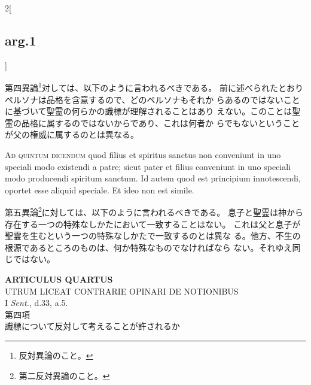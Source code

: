 \documentclass[paper=a4paper,fontsize=10pt,jafontsize=9pt,titlepage]{jlreq}
\begin{document}
\begin{paracol}{2}[\subsection{arg.1}]
\switchcolumn

第四異論\footnote{反対異論のこと。}対しては、以下のように言われるべきである。
前に述べられたとおりペルソナは品格を含意するので、どのペルソナもそれか
らあるのではないことに基づいて聖霊の何らかの識標が理解されることはあり
えない。このことは聖霊の品格に属するのではないからであり、これは何者か
らでもないということが父の権威に属するのとは異なる。

\switchcolumn*[\subsection{ad.5}]

{\scshape Ad quintum dicendum} quod filius et spiritus sanctus non conveniunt in
uno speciali modo existendi a patre; sicut pater et filius conveniunt
in uno speciali modo producendi spiritum sanctum. Id autem quod est
principium innotescendi, oportet esse aliquid speciale. Et ideo non
est simile.

\switchcolumn

第五異論\footnote{第二反対異論のこと。}に対しては、以下のように言われるべきである。
息子と聖霊は神から存在する一つの特殊なしかたにおいて一致することはない。
これは父と息子が聖霊を生むという一つの特殊なしかたで一致するのとは異な
る。他方、不生の根源であるところのものは、何か特殊なものでなければなら
ない。それゆえ同じではない。

\end{paracol}
\newpage



\begin{center}
{\Large {\bfseries ARTICULUS QUARTUS}}\\
{\large UTRUM LICEAT CONTRARIE OPINARI DE NOTIONIBUS}\\
{\footnotesize I {\itshape Sent.}, d.33, a.5.}\\
{\Large 第四項\\識標について反対して考えることが許されるか}
\end{center}


{}
\setcounter{section}{4}
\setcounter{subsection}{0}
\end{document}
